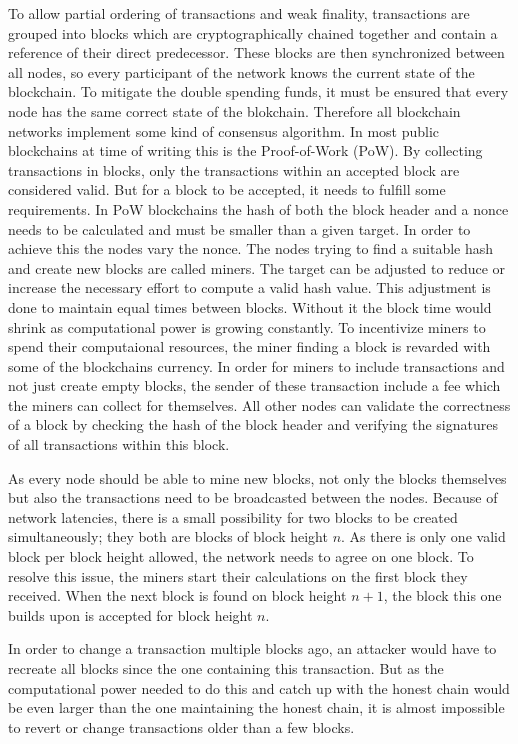\documentclass[10pt,conference,final]{IEEEtran}
\begin{document}
To allow partial ordering of transactions and weak finality, transactions are grouped into blocks which are cryptographically chained together and contain a reference of their direct predecessor.
These blocks are then synchronized between all nodes, so every participant of the network knows the current state of the blockchain.
To mitigate the double spending funds, it must be ensured that every node has the same correct state of the blokchain.
Therefore all blockchain networks implement some kind of consensus algorithm.
In most public blockchains at time of writing this is the Proof-of-Work (PoW).
By collecting transactions in blocks, only the transactions within an accepted block are considered valid.
But for a block to be accepted, it needs to fulfill some requirements.
In PoW blockchains the hash of both the block header and a nonce needs to be calculated and must be smaller than a given target.
In order to achieve this the nodes vary the nonce.
The nodes trying to find a suitable hash and create new blocks are called miners.
The target can be adjusted to reduce or increase the necessary effort to compute a valid hash value.
This adjustment is done to maintain equal times between blocks.
Without it the block time would shrink as computational power is growing constantly.
To incentivize miners to spend their computaional resources, the miner finding a block is revarded with some of the blockchains currency.
In order for miners to include transactions and not just create empty blocks, the sender of these transaction include a fee which the miners can collect for themselves.
All other nodes can validate the correctness of a block by checking the hash of the block header and verifying the signatures of all transactions within this block.

As every node should be able to mine new blocks, not only the blocks themselves but also the transactions need to be broadcasted between the nodes.
Because of network latencies, there is a small possibility for two blocks to be created simultaneously; they both are blocks of block height \(n\).
As there is only one valid block per block height allowed, the network needs to agree on one block.
To resolve this issue, the miners start their calculations on the first block they received.
When the next block is found on block height \(n + 1\), the block this one builds upon is accepted for block height \(n\).

In order to change a transaction multiple blocks ago, an attacker would have to recreate all blocks since the one containing this transaction.
But as the computational power needed to do this and catch up with the honest chain would be even larger than the one maintaining the honest chain, it is almost impossible to revert or change transactions older than a few blocks.
\end{document}
